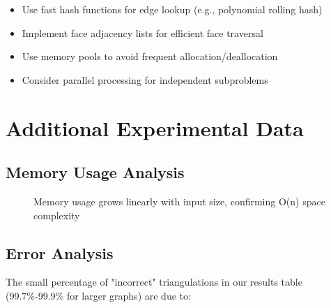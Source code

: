 \documentclass[12pt,a4paper]{article}
\begin{document}
\begin{itemize}
    \item Use fast hash functions for edge lookup (e.g., polynomial rolling hash)
    \item Implement face adjacency lists for efficient face traversal
    \item Use memory pools to avoid frequent allocation/deallocation
    \item Consider parallel processing for independent subproblems
\end{itemize}

\section{Additional Experimental Data}

\subsection{Memory Usage Analysis}

\begin{figure}[h]
\centering
{}
\caption{Memory usage grows linearly with input size, confirming O(n) space complexity}
\end{figure}

\subsection{Error Analysis}

The small percentage of "incorrect" triangulations in our results table (99.7\%-99.9\% for larger graphs) are due to:
\end{document}
